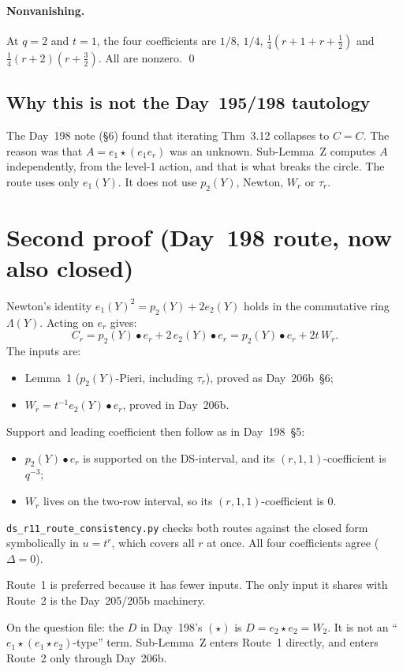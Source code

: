 \documentclass[11pt]{amsart}
\theoremstyle{remark}
\newcommand{\st}{\star}
\begin{document}
\paragraph{Nonvanishing.} At $q=2$ and $t=1$, the four coefficients are $1/8$, $1/4$, $\tfrac14(r+1+r+\tfrac12)$ and $\tfrac14(r+2)(r+\tfrac32)$. All are nonzero. \qed

\subsection*{Why this is not the Day~195/198 tautology}
The Day~198 note (\S6) found that iterating Thm~3.12 collapses to $C=C$. The reason was that $A=e_1\st(e_1e_r)$ was an unknown. Sub-Lemma~Z computes $A$ independently, from the level-1 action, and that is what breaks the circle. The route uses only $e_1(Y)$. It does not use $p_2(Y)$, Newton, $W_r$ or $\tau_r$.

\section{Second proof (Day~198 route, now also closed)}\label{sec:route2}

Newton's identity $e_1(Y)^2=p_2(Y)+2e_2(Y)$ holds in the commutative ring $\Lambda(Y)$. Acting on $e_r$ gives:
\[
C_r = p_2(Y)\bullet e_r + 2\,e_2(Y)\bullet e_r = p_2(Y)\bullet e_r + 2t\,W_r.
\]
The inputs are:
\begin{itemize}
\item Lemma~1 ($p_2(Y)$-Pieri, including $\tau_r$), proved as Day~206b~\S6;
\item $W_r=t^{-1}e_2(Y)\bullet e_r$, proved in Day~206b.
\end{itemize}
Support and leading coefficient then follow as in Day~198~\S5:
\begin{itemize}
\item $p_2(Y)\bullet e_r$ is supported on the DS-interval, and its $(r,1,1)$-coefficient is $q^{-3}$;
\item $W_r$ lives on the two-row interval, so its $(r,1,1)$-coefficient is $0$.
\end{itemize}
\texttt{ds\_r11\_route\_consistency.py} checks both routes against the closed form symbolically in $u=t^r$, which covers all $r$ at once. All four coefficients agree ($\Delta=0$).

Route~1 is preferred because it has fewer inputs. The only input it shares with Route~2 is the Day~205/205b machinery.

On the question file: the $D$ in Day~198's $(\st)$ is $D=e_2\st e_2=W_2$. It is not an ``$e_1\st(e_1\st e_2)$-type'' term. Sub-Lemma~Z enters Route~1 directly, and enters Route~2 only through Day~206b.
\end{document}
